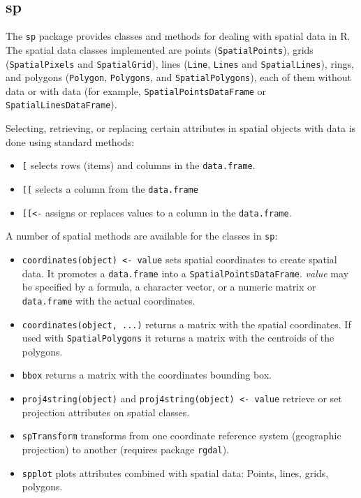 \subsection{sp}
\label{sec:sp}


The \texttt{sp} package \cite{Pebesma.Bivand2005} provides classes and
methods for dealing with spatial data in \textsf{R}. The spatial data
classes implemented are points (\texttt{SpatialPoints}), grids
(\texttt{SpatialPixels} and \texttt{SpatialGrid}), lines
(\texttt{Line}, \texttt{Lines} and \texttt{SpatialLines}), rings, and
polygons (\texttt{Polygon}, \texttt{Polygons}, and
\texttt{SpatialPolygons}), each of them without data or with data (for
example, \texttt{SpatialPointsDataFrame} or
\texttt{SpatialLinesDataFrame}).

Selecting, retrieving, or replacing certain attributes in spatial
objects with data is done using standard methods:
\begin{itemize}
\item \texttt{[} selects rows (items) and columns in the
  \texttt{data.frame}.
\item \texttt{[[} selects a column from the \texttt{data.frame}
\item \texttt{[[<-} assigns or replaces values to a column in the
  \texttt{data.frame}.
\end{itemize}

A number of spatial methods are available for the classes in \texttt{sp}:
\begin{itemize}
\item \texttt{coordinates(object) <- value} sets spatial coordinates
  to create spatial data. It promotes a \texttt{data.frame} into a
  \texttt{SpatialPointsDataFrame}. \emph{value} may be specified by a
  formula, a character vector, or a numeric matrix or
  \texttt{data.frame} with the actual coordinates.
\item \texttt{coordinates(object, ...)} returns a matrix with the
  spatial coordinates. If used with \texttt{SpatialPolygons} it
  returns a matrix with the centroids of the polygons.
\item \texttt{bbox} returns a matrix with the coordinates bounding
  box.
\item \texttt{proj4string(object)} and \texttt{proj4string(object) <-
    value} retrieve or set projection attributes on spatial classes.
\item \texttt{spTransform} transforms from one coordinate reference
  system (geographic projection) to another (requires package
  \texttt{rgdal}).
\item \texttt{spplot} plots attributes combined with spatial data:
  Points, lines, grids, polygons.
\end{itemize}

